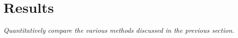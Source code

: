
\chapter{Results}
\label{ch:results}

\textit{Quantitatively compare the various methods discussed in the previous
section.}
